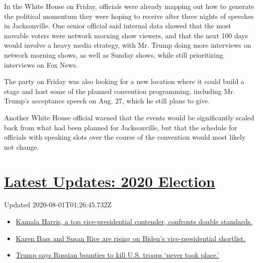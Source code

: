 In the White House on Friday, officials were already mapping out how to
generate the political momentum they were hoping to receive after three
nights of speeches in Jacksonville. One senior official said internal
data showed that the most movable voters were network morning show
viewers, and that the next 100 days would involve a heavy media
strategy, with Mr. Trump doing more interviews on network morning shows,
as well as Sunday shows, while still prioritizing interviews on Fox
News.

The party on Friday was also looking for a new location where it could
build a stage and host some of the planned convention programming,
including Mr. Trump's acceptance speech on Aug. 27, which he still plans
to give.

Another White House official warned that the events would be
significantly scaled back from what had been planned for Jacksonville,
but that the schedule for officials with speaking slots over the course
of the convention would most likely not change.

\hypertarget{latest-updates-2020-election}{%
\section{\texorpdfstring{\href{https://www.nytimes.com/2020/07/31/us/elections/biden-vs-trump.html?action=click\&pgtype=Article\&state=default\&region=MAIN_CONTENT_1\&context=storylines_live_updates}{Latest
Updates: 2020
Election}}{Latest Updates: 2020 Election}}\label{latest-updates-2020-election}}

Updated 2020-08-01T01:26:45.732Z

\begin{itemize}
\tightlist
\item
  \href{https://www.nytimes.com/2020/07/31/us/elections/biden-vs-trump.html?action=click\&pgtype=Article\&state=default\&region=MAIN_CONTENT_1\&context=storylines_live_updates\#link-29fdff45}{Kamala
  Harris, a top vice-presidential contender, confronts double
  standards.}
\item
  \href{https://www.nytimes.com/2020/07/31/us/elections/biden-vs-trump.html?action=click\&pgtype=Article\&state=default\&region=MAIN_CONTENT_1\&context=storylines_live_updates\#link-13ec3d9c}{Karen
  Bass and Susan Rice are rising on Biden's vice-presidential
  shortlist.}
\item
  \href{https://www.nytimes.com/2020/07/31/us/elections/biden-vs-trump.html?action=click\&pgtype=Article\&state=default\&region=MAIN_CONTENT_1\&context=storylines_live_updates\#link-49e9a016}{Trump
  says Russian bounties to kill U.S. troops `never took place.'}
\end{itemize}

